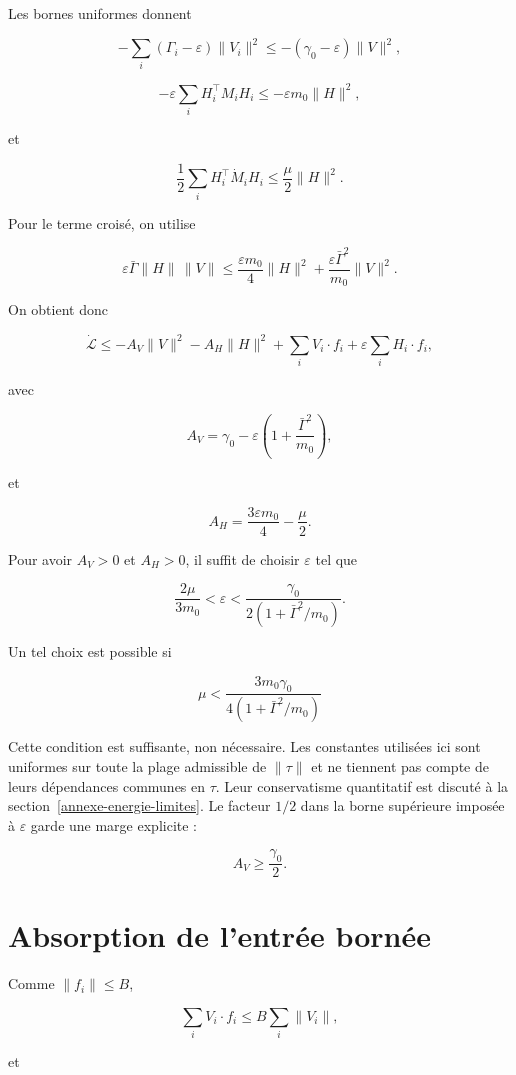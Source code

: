 Les bornes uniformes donnent

\[
-\sum_i(\Gamma_i-\varepsilon)\|V_i\|^2
\leq
-(\gamma_0-\varepsilon)\|V\|^2,
\]

\[
-\varepsilon\sum_iH_i^\top M_iH_i
\leq
-\varepsilon m_0\|H\|^2,
\]

et

\[
\frac12\sum_iH_i^\top\dot M_iH_i
\leq
\frac{\mu}{2}\|H\|^2.
\]

Pour le terme croisé, on utilise

\[
\varepsilon\bar\Gamma\|H\|\,\|V\|
\leq
\frac{\varepsilon m_0}{4}\|H\|^2
+
\frac{\varepsilon\bar\Gamma^2}{m_0}\|V\|^2.
\]

On obtient donc

\[
\dot{\mathcal L}
\leq
-A_V\|V\|^2
-A_H\|H\|^2
+
\sum_iV_i\cdot f_i
+
\varepsilon\sum_iH_i\cdot f_i,
\]

avec

\[
A_V
=
\gamma_0
-
\varepsilon
\left(
1+\frac{\bar\Gamma^2}{m_0}
\right),
\]

et

\[
A_H
=
\frac{3\varepsilon m_0}{4}
-
\frac{\mu}{2}.
\]

Pour avoir \(A_V>0\) et \(A_H>0\), il suffit de choisir
\(\varepsilon\) tel que

\[
\frac{2\mu}{3m_0}
<
\varepsilon
<
\frac{\gamma_0}
{2\left(1+\bar\Gamma^2/m_0\right)}.
\]

Un tel choix est possible si

\[
\boxed{
\mu
<
\frac{3m_0\gamma_0}
{4\left(1+\bar\Gamma^2/m_0\right)}
}
\tag{S}
\]

Cette condition est suffisante, non nécessaire. Les constantes utilisées ici sont uniformes sur toute la plage admissible de \(\|\tau\|\) et ne tiennent pas compte de leurs dépendances communes en \(\tau\). Leur conservatisme quantitatif est discuté à la section~\ref{annexe-energie-limites}. Le facteur \(1/2\) dans la borne supérieure imposée à \(\varepsilon\) garde une marge explicite :

\[
A_V\geq\frac{\gamma_0}{2}.
\]

\section{Absorption de l'entrée bornée}
\label{annexe-energie-entree-bornee}

Comme \(\|f_i\|\leq B\),

\[
\sum_iV_i\cdot f_i
\leq
B\sum_i\|V_i\|,
\]

et

